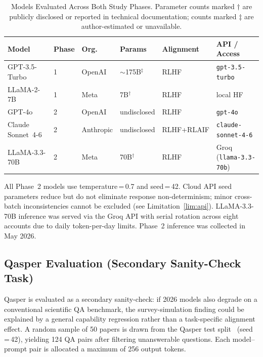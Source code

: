 \documentclass[12pt,a4paper]{article}
\begin{document}
\begin{table}[ht]
\caption{Models Evaluated Across Both Study Phases.
  Parameter counts marked $\dagger$ are publicly disclosed or reported
  in technical documentation; counts marked $\ddagger$ are author-estimated
  or unavailable.}
\label{tab:models}
\centering\small
\setlength{\tabcolsep}{4pt}
\begin{tabular}{llllll}
\toprule
\textbf{Model} & \textbf{Phase} & \textbf{Org.}
  & \textbf{Params} & \textbf{Alignment} & \textbf{API / Access} \\
\midrule
GPT-3.5-Turbo     & 1 & OpenAI    & $\sim$175B$^{\ddagger}$
  & RLHF      & \texttt{gpt-3.5-turbo} \\
LLaMA-2-7B        & 1 & Meta      & 7B$^{\dagger}$
  & RLHF      & local HF \\
\midrule
GPT-4o            & 2 & OpenAI    & undisclosed
  & RLHF      & \texttt{gpt-4o} \\
Claude Sonnet~4-6 & 2 & Anthropic & undisclosed
  & RLHF+RLAIF & \texttt{claude-sonnet-4-6} \\
LLaMA-3.3-70B     & 2 & Meta      & 70B$^{\dagger}$
  & RLHF      & Groq (\texttt{llama-3.3-70b}) \\
\bottomrule
\end{tabular}
\end{table}

All Phase~2 models use temperature\,=\,0.7 and seed\,=\,42.
Cloud API seed parameters reduce but do not eliminate response
non-determinism; minor cross-batch inconsistencies cannot be excluded
(see Limitation~\ref{lim:api}).
LLaMA-3.3-70B inference was served via the Groq API with serial
rotation across eight accounts due to daily token-per-day limits.
Phase~2 inference was collected in May 2026.

\subsection{Qasper Evaluation (Secondary Sanity-Check Task)}
\label{sec:method:qasper}

Qasper is evaluated as a secondary sanity-check: if 2026 models also
degrade on a conventional scientific QA benchmark, the survey-simulation
finding could be explained by a general capability regression rather
than a task-specific alignment effect.
A random sample of 50 papers is drawn from the Qasper test
split~\cite{dasigi2021} (seed\,=\,42), yielding 124 QA pairs after
filtering unanswerable questions.
Each model--prompt pair is allocated a maximum of 256 output tokens.
\end{document}
